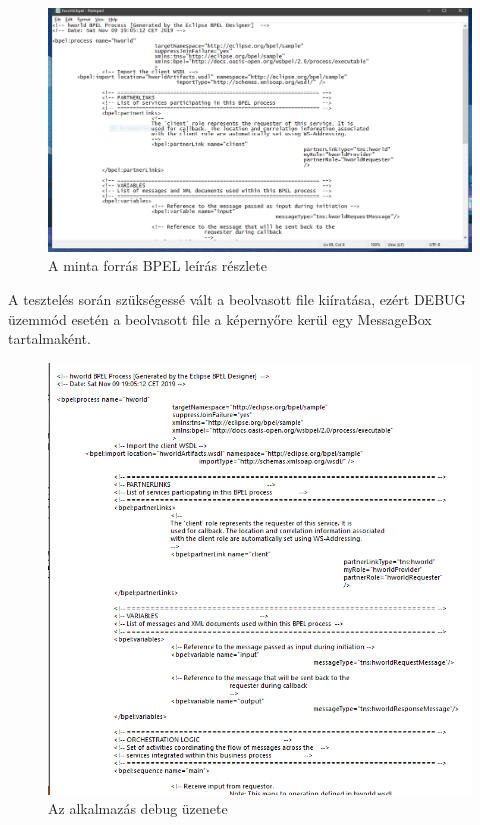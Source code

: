 \begin{figure}[h!]
\centering
\includegraphics[scale=0.4]{images/source.png}
\caption{A minta forrás BPEL leírás részlete}
\end{figure}

A tesztelés során szükségessé vált a beolvasott file kiíratása, ezért DEBUG üzemmód esetén a beolvasott file a képernyőre kerül egy MessageBox tartalmaként.
\begin{figure}[h!]
\centering
\includegraphics[scale=0.4]{images/debug.png}
\caption{Az alkalmazás debug üzenete}
\end{figure}

